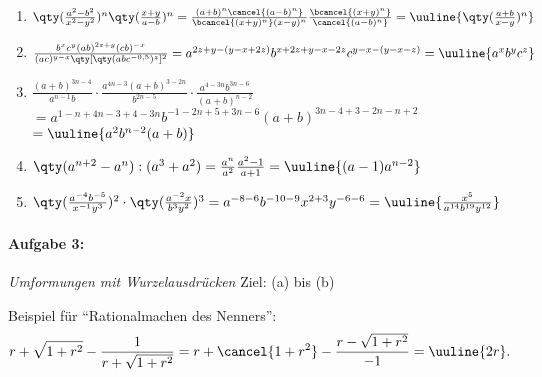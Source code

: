 \begin{enumerate}[label=(\alph*)]
    \item $\qty(\frac{a^2-b^2}{x^2-y^2})^n\qty(\frac{x+y}{a-b})^n = \frac{(a+b)^n \cancel{(a-b)^n}}{\bcancel{(x+y)^n}(x-y)^n} \frac{\bcancel{(x+y)^n}}{\cancel{(a-b)^n}} = \uuline{\qty(\frac{a+b}{x-y})^n}$
    \item $\frac{b^xc^y(ab)^{2z+y}(cb)^{-x}}{(ac)^{y-x}\qty[\qty(abc^{-0,5})^z]^2} = a^{2z + y -(y-x+2z)} b^{x+2z+y-x-2z} c^{y-x-(y-x-z)} = \uuline{a^x b^y c^z}$
    \item $\frac{(a+b)^{3n-4}}{a^{n-1}b}\cdot\frac{a^{4n-3}(a+b)^{3-2n}}{b^{2n-5}}\cdot\frac{a^{4-3n}b^{3n-6}}{(a+b)^{n-2}} $\\
    $= a^{1-n+4n-3+4-3n} b^{-1-2n+5+3n-6} (a+b)^{3n-4+3-2n-n+2} $ \\
    $= \uuline{a^2 b^{n-2}(a+b)}$
    \item $\qty(a^{n+2}-a^n):(a^3+a^2) = \frac{a^n}{a^2}\frac{a^2-1}{a+1} = \uuline{(a-1) a^{n-2}}$
    \item $\qty(\frac{a^{-4}b^{-5}}{x^{-1}y^3})^2\cdot\qty(\frac{a^{-2}x}{b^3y^2})^3 = a^{-8-6} b^{-10-9} x^{2+3} y^{-6-6} = \uuline{\frac{x^5}{a^{14} b^{19} y^{12}}}$
\end{enumerate}
%
\newpage
\paragraph{Aufgabe 3: } \emph{Umformungen mit Wurzelausdrücken} \hfill Ziel: (a) bis (b)\\[0.2cm]

Beispiel für ``Rationalmachen des Nenners'':
\begin{align*}
    r + \sqrt{1+r^2} - \frac{1}{r+\sqrt{1+r^2}} = r + \cancel{1+r^2} - \frac{r-\sqrt{1+r^2}}{-1} = \uuline{2r}.
\end{align*}

